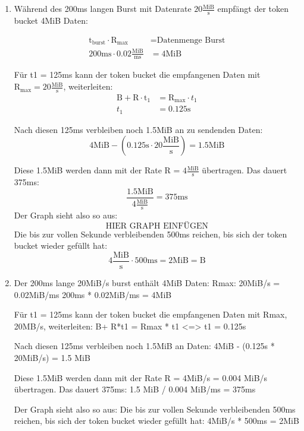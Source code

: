 \documentclass[a4paper,
			llpt,
			solution,
			accentcolor=tud2d,
			colorbacktitle
			]
			{tudexercise}
\begin{document}
\section{}
\begin{enumerate}
\item
Während des 200ms langen Burst mit Datenrate $20\frac{\mathrm{MiB}}{\mathrm{s}}$ empfängt der token bucket 4MiB Daten: 

\begin{align*}
\text{t}_\text{burst}  \cdot \text{R}_\text{max} &= \text{Datenmenge Burst}
\\
200\mathrm{ms} \cdot 0.02\frac{\mathrm{MiB}}{\mathrm{ms}} &= \mathrm{4MiB}
\end{align*}


Für t1 = 125ms kann der token bucket die empfangenen Daten mit $\mathrm{R}_{\mathrm{max}} = 20\frac{\mathrm{MiB}}{\mathrm{s}}$, weiterleiten:
\begin{align*}
\mathrm{B} + \mathrm{R}\cdot\mathrm{t}_1 &= \mathrm{R}_ {\mathrm{max}} \cdot t_1
\\
t_1 &= 0.125\mathrm{s}
\end{align*}

Nach diesen 125ms verbleiben noch 1.5MiB an zu sendenden Daten:
$$4\mathrm{MiB} - \left(0.125\mathrm{s} \cdot 20\frac{\mathrm{MiB }}{\mathrm{s}}\right) = 1.5 \mathrm{MiB}$$

Diese 1.5MiB werden dann mit der Rate R = $4\frac{\mathrm{MiB}}{\mathrm{s}}
$
übertragen. Das dauert 375ms:
$$
\frac{1.5 \mathrm{MiB}}{ 4 \frac{\mathrm{MiB}}{\mathrm{s}}} = 375\mathrm{ms}
$$
Der Graph sieht also so aus:
$$\text{HIER GRAPH EINFÜGEN}$$
Die bis zur vollen Sekunde verbleibenden 500ms reichen, bis sich der token bucket wieder gefüllt hat: 
$$
4\frac{\mathrm{MiB}}{\mathrm{s}} \cdot 500\mathrm{ms} = 2\mathrm{MiB} = \mathrm{B}
$$
\item
Der 200ms lange 20MiB/s burst enthält 4MiB Daten:
Rmax: 20MiB/s = 0.02MiB/ms
200ms * 0.02MiB/ms = 4MiB

Für t1 = 125ms kann der token bucket die empfangenen Daten mit Rmax, 20MB/s, weiterleiten:
B+ R*t1 = Rmax * t1
<=> t1 = 0.125s

Nach diesen 125ms verbleiben noch 1.5MiB an Daten:
4MiB - (0.125s * 20MiB/s) = 1.5 MiB

Diese 1.5MiB werden dann mit der Rate R = 4MiB/s = 0.004 MiB/s übertragen. Das dauert 375ms:
1.5 MiB / 0.004 MiB/ms = 375ms

Der Graph sieht also so aus:
Die bis zur vollen Sekunde verbleibenden 500ms reichen, bis sich der token bucket wieder gefüllt hat: 4MiB/s * 500ms = 2MiB

\end{enumerate}

\section{}
\section{}
\end{document}
